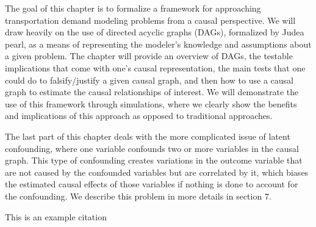 The goal of this chapter is to formalize a framework for approaching 
transportation demand modeling problems from a causal perspective. We will 
draw heavily on the use of directed acyclic graphs (DAGs), formalized by Judea 
pearl, as a means of representing the modeler's knowledge and assumptions 
about a given problem. The chapter will provide an overview of DAGs, the 
testable implications that come with one's causal representation, the main 
tests that one could do to falsify/justify a given causal graph, and then how 
to use a causal graph to estimate the causal relationships of interest. We 
will demonstrate the use of this framework through simulations, where we 
clearly show the benefits and implications of this approach as opposed to 
traditional approaches. 


The last part of this chapter deals with the more complicated issue of latent 
confounding, where one variable confounds two or more variables in the causal 
graph. This type of confounding creates variations in the outcome variable that are not caused by 
the confounded variables but are correlated by it, which biases the estimated 
causal effects of those variables if nothing is done to account for the 
confounding. We describe this problem in more details in section 7.





\blindtext[2]

This is an example citation \cite{brathwaite_2018_causal}
